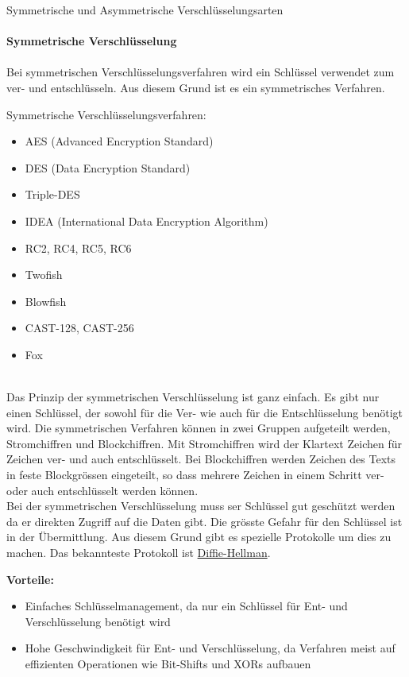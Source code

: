 \documentclass{report}
\begin{document}
\Huge Symmetrische und Asymmetrische Verschlüsselungsarten\normalsize
\\
\\
\huge \textbf{Symmetrische Verschlüsselung} \normalsize 
\\
\\
Bei symmetrischen Verschlüsselungsverfahren wird ein Schlüssel verwendet zum ver- und entschlüsseln. Aus diesem Grund ist es ein symmetrisches Verfahren.

Symmetrische Verschlüsselungsverfahren:

\begin{itemize}
    \item AES (Advanced Encryption Standard)
    \item DES (Data Encryption Standard)
    \item Triple-DES
    \item IDEA (International Data Encryption Algorithm)
    \item RC2, RC4, RC5, RC6
    \item Twofish
    \item Blowfish
    \item CAST-128, CAST-256
    \item Fox
\end{itemize} \cite{1} \\

Das Prinzip der symmetrischen Verschlüsselung ist ganz einfach. Es gibt nur einen Schlüssel, der sowohl für die Ver- wie auch für die Entschlüsselung benötigt wird. 
Die symmetrischen Verfahren können in zwei Gruppen aufgeteilt werden, Stromchiffren und Blockchiffren. Mit Stromchiffren wird der Klartext Zeichen für Zeichen ver- und auch entschlüsselt. Bei Blockchiffren werden Zeichen des Texts in feste Blockgrössen eingeteilt, so dass mehrere Zeichen in einem Schritt ver- oder auch entschlüsselt werden können. \\

Bei der symmetrischen Verschlüsselung muss ser Schlüssel gut geschützt werden da er direkten Zugriff auf die Daten gibt. Die grösste Gefahr für den Schlüssel ist in der Übermittlung. Aus diesem Grund gibt es spezielle Protokolle um dies zu machen. Das bekannteste Protokoll ist \href{https://www.youtube.com/watch?v=NmM9HA2MQGI}{Diffie-Hellman}.


\textbf{Vorteile:}
\begin{itemize}
    \item Einfaches Schlüsselmanagement, da nur ein Schlüssel für Ent- und Verschlüsselung benötigt wird
    \item Hohe Geschwindigkeit für Ent- und Verschlüsselung, da Verfahren meist auf effizienten Operationen wie Bit-Shifts und XORs aufbauen
\end{itemize}\cite{1} \\
\end{document}
